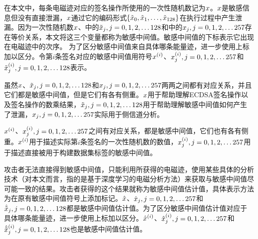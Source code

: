 {{%
}	
	在本文中，每条电磁迹对应的签名操作所使用的一次性随机数记为$x$。$x$是敏感信息但没有直接泄漏，$x$通过它的编码形式$\left\{\tilde{x}_0,\tilde{x}_1,\dots,\tilde{x}_{128}\right\}$在执行过程中产生泄漏。因为一次性随机数$x$、中的$\tilde{x}_j,j=0,1,2,\dots128$和中的$x_j,j=0,1,2,\dots257$存在等价关系，本文将这三个变量都称为敏感中间值。敏感中间值的下标表示它出现在电磁迹中的次序。
	为了区分敏感中间值来自具体哪条能量迹，进一步使用上标加以区分。令第$i$条签名对应的敏感中间值用符号$x^{(i)}$、$x^{(i)}_j,j=0,1,2,\dots257$和$\tilde{x}^{(i)}_j,j=0,1,2,\dots128$表示。
	
	虽然$x$、$\tilde{x}_j,j=0,1,2,\dots128$和$x_j,j=0,1,2,\dots257$两两之间都有对应关系，并且它们都是敏感中间值，但是它们有各有侧重。$x$用于帮助理解ECDSA签名操作以及签名操作的数乘结果，$\tilde{x}_j,j=0,1,2,\dots128$用于帮助理解敏感中间值如何产生了泄漏，$x_j,j=0,1,2,\dots257$实际用于侧信道分析。
	
	$x^{(i)}$、$x^{(i)}_j,j=0,1,2,\dots257$之间有对应关系，都是敏感中间值，它们也有各有侧重。$x^{(i)}$用于描述实际第$i$条签名的一次性随机数的数值，$x^{(i)}_j,j=0,1,2,\dots257$用于描述直接被用于构建数据集标签的敏感中间值。

	攻击者无法直接得到敏感中间值，只能利用所获得的电磁迹，使用某些具体的分析技术（对本文而言，指的是基于深度学习的电磁分析方法）来获取与敏感中间值尽可能一致的结果。攻击者获得的这个结果就称为敏感中间值估计值，具体表示方法为在原有敏感中间值符号上添加$\hat{}$标记。$\hat{x}$、$\hat{x}_j,j=0,1,2,\dots257$和$\hat{\tilde{x}}_j,j=0,1,2,\dots128$都是敏感中间值估计值。为了区分敏感中间值估计值对应于具体哪条能量迹，进一步使用上标加以区分。$\hat{x}^{(i)}$、$\hat{x}^{(i)}_j,j=0,1,2,\dots257$和$\hat{\tilde{x}}^{(i)}_j,j=0,1,2,\dots128$也是敏感中间值估计值。
	
	
}
